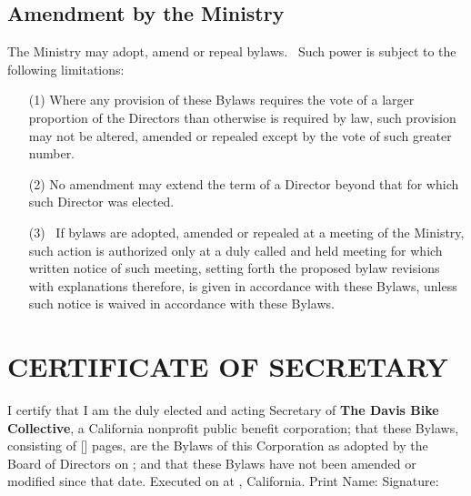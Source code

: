 \documentclass[letterpaper,titlepage]{article}
\begin{document}
\subsection{Amendment by the Ministry}
\label{sec:amendementMinistry}
The Ministry may adopt, amend or repeal bylaws.  Such power is subject to the
following limitations:
\begin{itemize}
    \item[(1)] Where any provision of these Bylaws requires the vote of a
        larger proportion of the Directors than otherwise is required by law,
        such provision may not be altered, amended or repealed except by the
        vote of such greater number.
    \item[(2)] No amendment may extend the term of a Director beyond that for
        which such Director was elected.
    \item[(3)] If bylaws are adopted, amended or repealed at a meeting of the
        Ministry, such action is authorized only at a duly called and held
        meeting for which written notice of such meeting, setting forth the
        proposed bylaw revisions with explanations therefore, is given in
        accordance with these Bylaws, unless such notice is waived in
        accordance with these Bylaws.
\end{itemize}
\newpage
\section{CERTIFICATE OF SECRETARY}
I certify that I am the duly elected and acting Secretary of {\bf The Davis
Bike Collective}, a California nonprofit public benefit corporation; that these
Bylaws, consisting of [\pageref{LastPage}] pages, are the Bylaws of this
Corporation as adopted by the Board of Directors on \underline{\hspace{1.5in}};
and that these Bylaws have not been amended or modified since that date.
\vskip 0.2in
Executed on \underline{\hspace{1.5in}} at \underline{\hspace{1.5in}},
California.
\vskip 0.2in
Print Name: \underline{\hspace{4in}}
\vskip 0.2in
Signature: \underline{\hspace{4in}}
\end{document}
